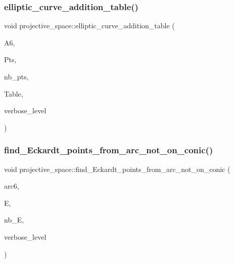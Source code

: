 \subsubsection{\texorpdfstring{elliptic\+\_\+curve\+\_\+addition\+\_\+table()}{elliptic\_curve\_addition\_table()}}
{\footnotesize\ttfamily void projective\+\_\+space\+::elliptic\+\_\+curve\+\_\+addition\+\_\+table (\begin{DoxyParamCaption}\item[{\mbox{\hyperlink{galois_8h_a09fddde158a3a20bd2dcadb609de11dc}{I\+NT}} $\ast$}]{A6,  }\item[{\mbox{\hyperlink{galois_8h_a09fddde158a3a20bd2dcadb609de11dc}{I\+NT}} $\ast$}]{Pts,  }\item[{\mbox{\hyperlink{galois_8h_a09fddde158a3a20bd2dcadb609de11dc}{I\+NT}}}]{nb\+\_\+pts,  }\item[{\mbox{\hyperlink{galois_8h_a09fddde158a3a20bd2dcadb609de11dc}{I\+NT}} $\ast$\&}]{Table,  }\item[{\mbox{\hyperlink{galois_8h_a09fddde158a3a20bd2dcadb609de11dc}{I\+NT}}}]{verbose\+\_\+level }\end{DoxyParamCaption})}

\mbox{\label{classprojective__space_a3b4fbef8fbbeee1af542b6f7c969ed79}} 
\subsubsection{\texorpdfstring{find\+\_\+\+Eckardt\+\_\+points\+\_\+from\+\_\+arc\+\_\+not\+\_\+on\+\_\+conic()}{find\_Eckardt\_points\_from\_arc\_not\_on\_conic()}}
{\footnotesize\ttfamily void projective\+\_\+space\+::find\+\_\+\+Eckardt\+\_\+points\+\_\+from\+\_\+arc\+\_\+not\+\_\+on\+\_\+conic (\begin{DoxyParamCaption}\item[{\mbox{\hyperlink{galois_8h_a09fddde158a3a20bd2dcadb609de11dc}{I\+NT}} $\ast$}]{arc6,  }\item[{\mbox{\hyperlink{classeckardt__point}{eckardt\+\_\+point}} $\ast$\&}]{E,  }\item[{\mbox{\hyperlink{galois_8h_a09fddde158a3a20bd2dcadb609de11dc}{I\+NT}} \&}]{nb\+\_\+E,  }\item[{\mbox{\hyperlink{galois_8h_a09fddde158a3a20bd2dcadb609de11dc}{I\+NT}}}]{verbose\+\_\+level }\end{DoxyParamCaption})}


